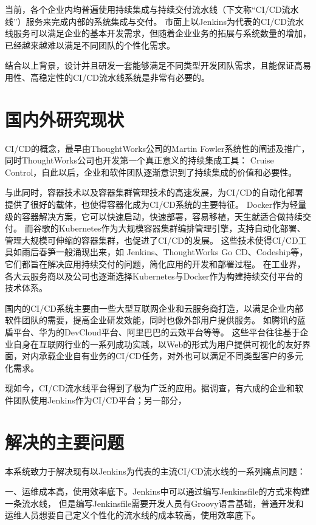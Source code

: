 当前，各个企业内均普遍使用持续集成与持续交付流水线（下文称“CI/CD流水线”）服务来完成内部的系统集成与交付。
市面上以Jenkins为代表的CI/CD流水线服务可以满足企业的基本开发需求，但随着企业业务的拓展与系统数量的增加，已经越来越难以满足不同团队的个性化需求。

结合以上背景，设计并且研发一套能够满足不同类型开发团队需求，且能保证高易用性、高稳定性的CI/CD流水线系统是非常有必要的。


\section{国内外研究现状}
CI/CD的概念，最早由ThoughtWorks公司的Martin Fowler系统性的阐述及推广\cite{CI首作}，同时ThoughtWorks公司也开发第一个真正意义的持续集成工具：
Cruise Control\cite{绪论持续集成1}，自此以后，企业和软件团队逐渐意识到了持续集成的价值和必要性。

与此同时，容器技术以及容器集群管理技术的高速发展，为CI/CD的自动化部署提供了很好的载体\cite{docker}，也使得容器化成为CI/CD系统的主要特征。
Docker作为轻量级的容器解决方案，它可以快速启动，快速部署，容易移植，天生就适合做持续交付。
而谷歌的Kubernetes作为大规模容器集群编排管理引擎，支持自动化部署、管理大规模可伸缩的容器集群，也促进了CI/CD的发展。
这些技术使得CI/CD工具如雨后春笋一般涌现出来，如 Jenkins、ThoughtWorks Go CD、Codeship等，它们都旨在解决应用持续交付的问题，简化应用的开发和部署过程。
在工业界，各大云服务商以及公司也逐渐选择Kubernetes与Docker作为构建持续交付平台的技术体系。




国内的CI/CD系统主要由一些大型互联网企业和云服务商打造，以满足企业内部软件团队的需要，提高企业研发效能，同时也像外部用户提供服务。
如腾讯的蓝盾平台、华为的DevCloud平台、阿里巴巴的云效平台等等。
这些平台往往基于企业自身在互联网行业的一系列成功实践，以Web的形式为用户提供可视化的友好界面，对内承载企业自有业务的CI/CD任务，对外也可以满足不同类型客户的多元化需求。

现如今，CI/CD流水线平台得到了极为广泛的应用。据调查，有六成的企业和软件团队使用Jenkins作为CI/CD平台\cite{DevOps中国调查研究}；另一部分，




\section{解决的主要问题}
本系统致力于解决现有以Jenkins为代表的主流CI/CD流水线的一系列痛点问题：

一、运维成本高，使用效率底下。Jenkins中可以通过编写Jenkinsfile的方式来构建一条流水线，
但是编写Jenkinsfile需要开发人员有Groovy语言基础，普通开发和运维人员想要自己定义个性化的流水线的成本较高，使用效率底下。

